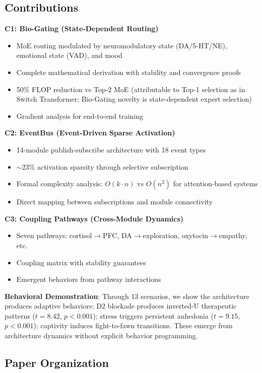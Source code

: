 \documentclass[preprint,12pt]{elsarticle}
\begin{document}
\subsection{Contributions}

\textbf{C1: Bio-Gating (State-Dependent Routing)}
\begin{itemize}
\item MoE routing modulated by neuromodulatory state (DA/5-HT/NE), emotional state (VAD), and mood
\item Complete mathematical derivation with stability and convergence proofs
\item 50\% FLOP reduction vs Top-2 MoE (attributable to Top-1 selection as in Switch Transformer; Bio-Gating novelty is state-dependent expert selection)
\item Gradient analysis for end-to-end training
\end{itemize}

\textbf{C2: EventBus (Event-Driven Sparse Activation)}
\begin{itemize}
\item 14-module publish-subscribe architecture with 18 event types
\item $\sim$23\% activation sparsity through selective subscription
\item Formal complexity analysis: $O(k \cdot n)$ vs $O(n^2)$ for attention-based systems
\item Direct mapping between subscriptions and module connectivity
\end{itemize}

\textbf{C3: Coupling Pathways (Cross-Module Dynamics)}
\begin{itemize}
\item Seven pathways: cortisol$\rightarrow$PFC, DA$\rightarrow$exploration, oxytocin$\rightarrow$empathy, etc.
\item Coupling matrix with stability guarantees
\item Emergent behaviors from pathway interactions
\end{itemize}

\textbf{Behavioral Demonstration}: Through 13 scenarios, we show the architecture produces adaptive behaviors: D2 blockade produces inverted-U therapeutic patterns ($t=8.42$, $p<0.001$); stress triggers persistent anhedonia ($t=9.15$, $p<0.001$); captivity induces fight-to-fawn transitions. These emerge from architecture dynamics without explicit behavior programming.

\subsection{Paper Organization}
\end{document}
